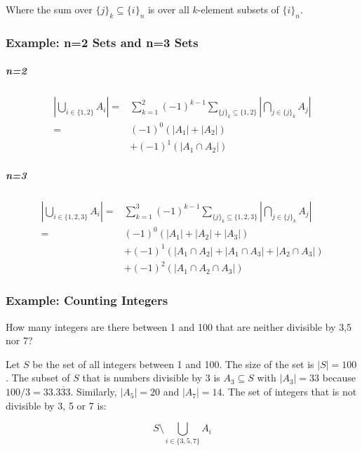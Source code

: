 Where the sum over $\{j\}_k \subseteq \{i\}_n$ is over all $k$-element subsets of $\{i\}_n$.

\subsubsection{Example: n=2 Sets and n=3 Sets}

\subparagraph{n=2}
\begin{equation}
\begin{array}{rl}
\left|\bigcup_{i\in\{1,2\}}A_i\right| =&  \sum^2_{k=1} (-1)^{k-1} \sum_{\{j\}_k \subseteq \{1,2\}} \left|\bigcap_{j\in\{j\}_k} A_j\right|\\
=&(-1)^{0}\left(|A_1| + |A_2|\right) \\
&+ (-1)^{1}\left(|A_1 \cap A_2| \right)
\end{array}
\end{equation}


\subparagraph{n=3}
\begin{equation}
\begin{array}{rl}
\left|\bigcup_{i\in\{1,2,3\}}A_i\right| =&  \sum^3_{k=1} (-1)^{k-1} \sum_{\{j\}_k \subseteq \{1,2,3\}} \left|\bigcap_{j\in\{j\}_k} A_j\right|\\
=&(-1)^{0}\left(|A_1| + |A_2| + |A_3|\right) \\
&+ (-1)^{1}\left(|A_1 \cap A_2|  + |A_1 \cap A_3| + |A_2 \cap A_3|  \right) \\ 
&+ (-1)^{2}\left(|A_1 \cap A_2 \cap A_3|   \right)
\end{array}
\end{equation}

\subsubsection{Example: Counting Integers}

How many integers are there between 1 and 100 that are neither divisible by 3,5 nor 7?

Let $S$ be the set of all integers between 1 and 100. The size of the set is $|S| = 100$. The subset of $S$ that is numbers divisible by 3 is $A_3 \subseteq S$ with $|A_3| = 33$ because $100/3 = 33.\overline{333}$. Similarly, $|A_5| = 20$ and $|A_7| = 14$.  The set of integers that is not divisible by 3, 5 or 7 is:

\begin{equation}
S \setminus \bigcup_{i\in\{3,5,7\}} A_i
\end{equation}


